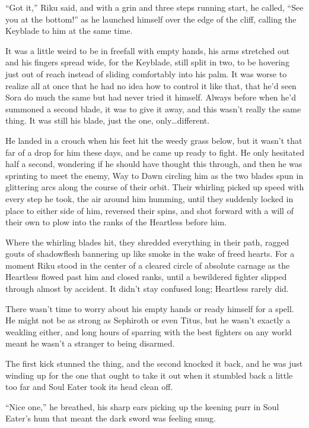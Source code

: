 ``Got it,'' Riku said, and with a grin and three steps running start, he called, ``See you at the bottom!'' as he launched himself over the edge of the cliff, calling the Keyblade to him at the same time.

It was a little weird to be in freefall with empty hands, his arms stretched out and his fingers spread wide, for the Keyblade, still split in two, to be hovering just out of reach instead of sliding comfortably into his palm. It was worse to realize all at once that he had no idea how to control it like that, that he'd seen Sora do much the same but had never tried it himself. Always before when he'd summoned a second blade, it was to give it away, and this wasn't really the same thing. It was still his blade, just the one, only\ldots different.

He landed in a crouch when his feet hit the weedy grass below, but it wasn't that far of a drop for him these days, and he came up ready to fight. He only hesitated half a second, wondering if he should have thought this through, and then he was sprinting to meet the enemy, Way to Dawn circling him as the two blades spun in glittering arcs along the course of their orbit. Their whirling picked up speed with every step he took, the air around him humming, until they suddenly locked in place to either side of him, reversed their spins, and shot forward with a will of their own to plow into the ranks of the Heartless before him.

Where the whirling blades hit, they shredded everything in their path, ragged gouts of shadowflesh bannering up like smoke in the wake of freed hearts. For a moment Riku stood in the center of a cleared circle of absolute carnage as the Heartless flowed past him and closed ranks, until a bewildered fighter slipped through almost by accident. It didn't stay confused long; Heartless rarely did.

There wasn't time to worry about his empty hands or ready himself for a spell. He might not be as strong as Sephiroth or even Titus, but he wasn't exactly a weakling either, and long hours of sparring with the best fighters on any world meant he wasn't a stranger to being disarmed.

The first kick stunned the thing, and the second knocked it back, and he was just winding up for the one that ought to take it out when it stumbled back a little too far and Soul Eater took its head clean off.

``Nice one,'' he breathed, his sharp ears picking up the keening purr in Soul Eater's hum that meant the dark sword was feeling smug.

